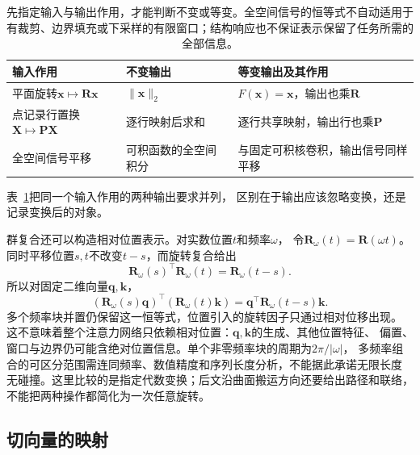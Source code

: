 \begin{table}[htbp]
 \centering\small
 \begin{tabularx}{\linewidth}{@{}lXX@{}}
 \toprule
 输入作用 & 不变输出 & 等变输出及其作用\\
 \midrule
 平面旋转$\bm x\mapsto\bm R\bm x$
 & $\lVert\bm x\rVert_2$ & $F(\bm x)=\bm x$，输出也乘$\bm R$\\
 点记录行置换$\bm X\mapsto\bm P\bm X$
 & 逐行映射后求和 & 逐行共享映射，输出行也乘$\bm P$\\
 全空间信号平移
 & 可积函数的全空间积分 & 与固定可积核卷积，输出信号同样平移\\
 \bottomrule
 \end{tabularx}
 \caption{先指定输入与输出作用，才能判断不变或等变。全空间信号的恒等式不自动适用于
 有裁剪、边界填充或下采样的有限窗口；结构响应也不保证表示保留了任务所需的全部信息。}
 \label{tab:geometry-invariance-equivariance}
\end{table}
表~\ref{tab:geometry-invariance-equivariance}把同一个输入作用的两种输出要求并列，
区别在于输出应该忽略变换，还是记录变换后的对象。


群复合还可以构造相对位置表示。对实数位置$t$和频率$\omega$，
令$\bm R_\omega(t)=\bm R(\omega t)$。同时平移位置$s,t$不改变$t-s$，而旋转复合给出
\begin{equation}
 \bm R_\omega(s)^\top\bm R_\omega(t)=\bm R_\omega(t-s).
 \label{eq:geometry-rotary-relative-position}
\end{equation}
所以对固定二维向量$\bm q,\bm k$，
\begin{equation}
 (\bm R_\omega(s)\bm q)^\top(\bm R_\omega(t)\bm k)
 =\bm q^\top\bm R_\omega(t-s)\bm k.
 \label{eq:geometry-rotary-dot-product}
\end{equation}
多个频率块并置仍保留这一恒等式，位置引入的旋转因子只通过相对位移出现。
这不意味着整个注意力网络只依赖相对位置：$\bm q,\bm k$的生成、其他位置特征、
偏置、窗口与边界仍可能含绝对位置信息。单个非零频率块的周期为$2\pi/|\omega|$，
多频率组合的可区分范围需连同频率、数值精度和序列长度分析，不能据此承诺无限长度
无碰撞。这里比较的是指定代数变换；后文沿曲面搬运方向还要给出路径和联络，
不能把两种操作都简化为一次任意旋转。


\subsection{切向量的映射}
\label{sec:geometry-tangent-maps}

